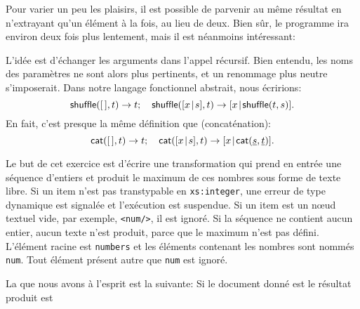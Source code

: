 Pour varier un peu les plaisirs, il est possible de parvenir au même
résultat en n'extrayant qu'un élément à la fois, au lieu de deux. Bien
sûr, le programme ira environ deux fois plus lentement, mais il est
néanmoins intéressant:
L'idée est d'échanger les arguments dans l'appel récursif. Bien
entendu, les noms des paramètres ne sont alors plus pertinents, et un
renommage plus neutre s'imposerait. Dans notre langage fonctionnel
abstrait, nous écririons:
\begin{equation*}
\textsf{shuffle}([\,],t) \rightarrow t;\quad
\textsf{shuffle}([{x}\!\mid\!{s}],t) \rightarrow [{x}\!\mid\!{\textsf{shuffle}(t,s)}].
\end{equation*}
En fait, c'est presque la même définition que  (concaténation):
\begin{equation*}
\textsf{cat}([\,],t) \rightarrow t;\quad
\textsf{cat}([{x}\!\mid\!{s}],t) \rightarrow [{x}\!\mid\!{\textsf{cat}(\underline{s},\underline{t})}].
\end{equation*}


Le but de cet exercice est d'écrire une transformation \XSLT qui prend
en entrée une séquence d'entiers et produit le maximum de ces nombres
sous forme de texte libre. Si un item n'est pas transtypable en
\texttt{xs:integer}, une erreur de type dynamique est signalée et
l'exécution est suspendue. Si un item est un n{\oe}ud textuel vide,
par exemple, \texttt{<num/>}, il est ignoré. Si la séquence ne
contient aucun entier, aucun texte n'est produit, parce que le
maximum n'est pas défini. L'élément racine est \texttt{numbers} et les
éléments contenant les nombres sont nommés \texttt{num}. Tout élément
présent autre que \texttt{num} est ignoré.

La \DTD que nous avons à l'esprit est la suivante:
\noindent Si le document donné est
\noindent le résultat produit est

